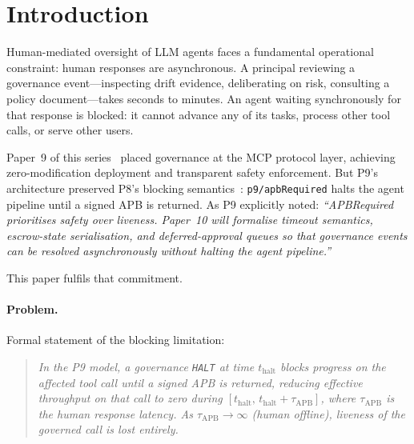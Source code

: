 \documentclass[11pt]{article}
\newcommand{\HALT}{\texttt{HALT}}
\newcommand{\thalt}{t_{\mathrm{halt}}}
\begin{document}
\section{Introduction}
\label{sec:intro}

Human-mediated oversight of LLM agents faces a fundamental operational
constraint: human responses are asynchronous. A principal reviewing a
governance event---inspecting drift evidence, deliberating on risk,
consulting a policy document---takes seconds to minutes. An agent
waiting synchronously for that response is blocked: it cannot advance
any of its tasks, process other tool calls, or serve other users.

Paper~9 of this series~\citep{fernandez2026mcpgov} placed governance at
the MCP protocol layer, achieving zero-modification deployment and
transparent safety enforcement. But P9's architecture preserved P8's
blocking semantics~\citep{fernandez2026ibg}: \texttt{p9/apbRequired}
halts the agent pipeline until a signed APB is returned. As P9 explicitly
noted: \emph{``APBRequired prioritises safety over liveness. Paper~10 will
formalise timeout semantics, escrow-state serialisation, and
deferred-approval queues so that governance events can be resolved
asynchronously without halting the agent pipeline.''}

This paper fulfils that commitment.

\paragraph{Problem.}
Formal statement of the blocking limitation:

\begin{quote}
\emph{In the P9 model, a governance \HALT{} at time $\thalt$ blocks
progress on the affected tool call until a signed APB is returned,
reducing effective throughput on that call to zero during
$[\thalt,\, \thalt + \tau_{\mathrm{APB}}]$, where $\tau_{\mathrm{APB}}$
is the human response latency. As $\tau_{\mathrm{APB}} \to \infty$
(human offline), liveness of the governed call is lost entirely.}
\end{quote}
\end{document}

